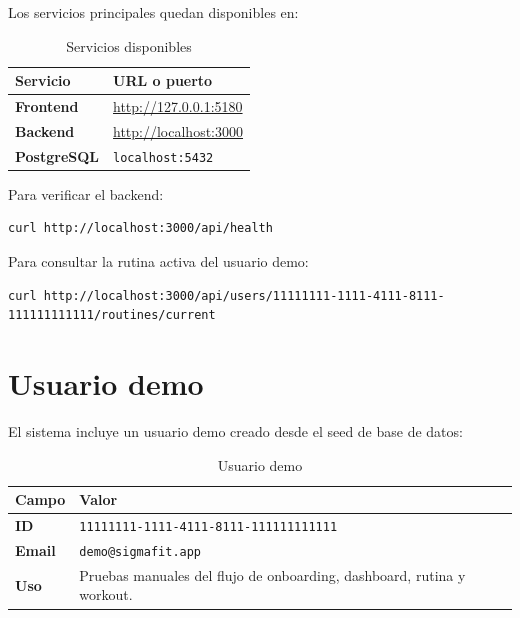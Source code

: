 \documentclass[12pt,a4paper]{article}
\begin{document}
Los servicios principales quedan disponibles en:

\begin{table}[H]
\centering
\caption{Servicios disponibles}
\renewcommand{\arraystretch}{1.3}
\begin{tabularx}{\textwidth}{>{\bfseries}p{3cm} X}
\toprule
Servicio & URL o puerto \\
\midrule
Frontend & \url{http://127.0.0.1:5180} \\
Backend & \url{http://localhost:3000} \\
PostgreSQL & \texttt{localhost:5432} \\
\bottomrule
\end{tabularx}
\end{table}

Para verificar el backend:

\begin{lstlisting}
curl http://localhost:3000/api/health
\end{lstlisting}

Para consultar la rutina activa del usuario demo:

\begin{lstlisting}
curl http://localhost:3000/api/users/11111111-1111-4111-8111-111111111111/routines/current
\end{lstlisting}

\section{Usuario demo}

El sistema incluye un usuario demo creado desde el seed de base de datos:

\begin{table}[H]
\centering
\caption{Usuario demo}
\renewcommand{\arraystretch}{1.3}
\begin{tabularx}{\textwidth}{>{\bfseries}p{3cm} X}
\toprule
Campo & Valor \\
\midrule
ID & \texttt{11111111-1111-4111-8111-111111111111} \\
Email & \texttt{demo@sigmafit.app} \\
Uso & Pruebas manuales del flujo de onboarding, dashboard, rutina y workout. \\
\bottomrule
\end{tabularx}
\end{table}

\end{document}
